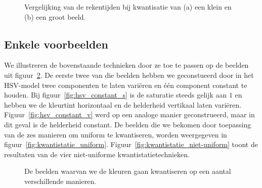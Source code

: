 \begin{figure}[bp]
\vspace{10pt}
\centering
{}
\caption{\label{fig:rekentijden_quant}Vergelijking van de rekentijden bij kwantisatie van 
(a) een klein en (b) een groot beeld.}
\end{figure}

\subsection{Enkele voorbeelden}

We illustreren de bovenstaande technieken door ze toe te passen op de beelden uit 
figuur~\ref{fig:kwantistatie_originelen}. De eerste twee van die beelden hebben we geconstueerd
door in het HSV-model twee componenten te laten vari\"eren en \'e\'en component constant te houden.
Bij figuur~\ref{fig:hsv_constant_s} is de saturatie steeds gelijk aan $1$ en hebben we de kleurtint 
horizontaal en de helderheid vertikaal laten vari\"eren. Figuur~\ref{fig:hsv_constant_v} werd 
op een analoge manier geconstrueerd, maar in dit geval is de helderheid constant.
De beelden die we bekomen door toepassing van de zes manieren om uniform te kwantiseren,
worden weergegeven in figuur~\ref{fig:kwantistatie_uniform}. Figuur~\ref{fig:kwantistatie_niet-uniform}
toont de resultaten van de vier niet-uniforme kwantistatietechnieken.

\begin{figure}[bp]
\vspace{10pt}
\centering
{}
\caption{\label{fig:kwantistatie_originelen}De beelden waarvan we de kleuren gaan kwantiseren 
op een aantal verschillende manieren.}
\end{figure}

